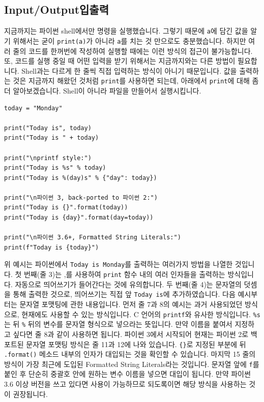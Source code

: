 \documentclass[../main.tex]{subfiles}
\begin{document}
\subsection{Input/Output입출력}
지금까지는 파이썬 shell에서만 명령을 실행했습니다.
그렇기 때문에 \texttt{a}에 담긴 값을 알기 위해서는 굳이 \texttt{print(a)}가 아니라 \texttt{a}를 치는 것 만으로도 충분했습니다.
하지만 여러 줄의 코드를 한꺼번에 작성하여 실행할 때에는 이런 방식의 접근이 불가능합니다.
또, 코드를 실행 중일 때 어떤 입력을 받기 위해서는 지금까지와는 다른 방법이 필요합니다.
Shell과는 다르게 한 줄씩 직접 입력하는 방식이 아니기 때문입니다.
값을 출력하는 것은 지금까지 해왔던 것처럼 \texttt{print}를 사용하면 되는데, 아래에서 \texttt{print}에 대해 좀 더 알아보겠습니다.
Shell이 아니라 파일을 만들어서 실행시킵니다.
\begin{verbatim}
today = "Monday"

print("Today is", today)
print("Today is " + today)

print("\nprintf style:")
print("Today is %s" % today)
print("Today is %(day)s" % {"day": today})

print("\n파이썬 3, back-ported to 파이썬 2:")
print("Today is {}".format(today))
print("Today is {day}".format(day=today))

print("\n파이썬 3.6+, Formatted String Literals:")
print(f"Today is {today}")
\end{verbatim}
위 예시는 파이썬에서 \texttt{Today is Monday}를 출력하는 여러가지 방법을 나열한 것입니다.
첫 번째(줄 3)는 ,를 사용하여 \texttt{print} 함수 내의 여러 인자들을 출력하는 방식입니다.
자동으로 띄어쓰기가 들어간다는 것에 유의합니다.
두 번째(줄 4)는 문자열의 덧셈을 통해 출력한 것으로, 띄어쓰기는 직접 앞 \texttt{Today is}에 추가하였습니다.
다음 예시부터는 문자열 포맷팅에 관한 내용입니다.
먼저 줄 7과 8의 예시는 과거 사용되었던 방식으로, 현재에도 사용할 수 있는 방식입니다.
C 언어의 \texttt{printf}와 유사한 방식입니다.
\texttt{\%s}는 뒤 \texttt{\%} 뒤의 변수를 문자열 형식으로 넣으라는 뜻입니다.
만약 이름을 붙여서 지정하고 싶다면 줄 8과 같이 사용하면 됩니다.
파이썬 3에서 시작되어 현재는 파이썬 2로 백포트된 문자열 포맷팅 방식은 줄 11과 12에 나와 있습니다.
\texttt{\{\}}로 지정된 부분에 뒤 \texttt{.format()} 메소드 내부의 인자가 대입되는 것을 확인할 수 있습니다.
마지막 15 줄의 방식이 가장 최근에 도입된 Formatted String Literals라는 것입니다.
문자열 앞에 \texttt{f}를 붙인 후 단순히 중괄호 안에 원하는 변수 이름을 넣으면 대입이 됩니다.
만약 파이썬 3.6 이상 버전을 쓰고 있다면 사용이 가능하므로 되도록이면 해당 방식을 사용하는 것이 권장됩니다.
\end{document}
